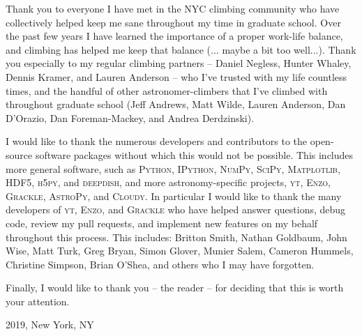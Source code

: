Thank you to everyone I have met in the NYC climbing community who have collectively
helped keep me sane throughout my time in graduate school. Over the past few years
I have learned the importance of a proper work-life balance, and climbing has helped
me keep that balance (... maybe a bit too well...). Thank you especially to my
regular climbing partners -- Daniel Negless, Hunter Whaley, Dennis Kramer, and Lauren Anderson -- who I've trusted
with my life countless times, and the handful of other astronomer-climbers that I've
climbed with throughout graduate school (Jeff Andrews, Matt Wilde, Lauren Anderson, Dan D'Orazio,
Dan Foreman-Mackey, and Andrea Derdzinski).

I would like to thank the numerous developers and contributors to the
open-source software packages without which this \dissertation would not be
possible. This includes more general software, such as \textsc{Python}, \textsc{IPython}, \textsc{NumPy},
\textsc{SciPy}, \textsc{Matplotlib}, \textsc{HDF5}, \textsc{h5py},
and \textsc{deepdish}, and more astronomy-specific projects,  \textsc{yt}, \textsc{Enzo},
\textsc{Grackle}, \textsc{AstroPy}, and \textsc{Cloudy}. In particular I would like
to thank the many developers of \textsc{yt}, \textsc{Enzo}, and \textsc{Grackle}
who have helped answer questions, debug code, review my pull requests, and implement
new features on my behalf throughout this process. This includes: Britton Smith, Nathan Goldbaum,
John Wise, Matt Turk, Greg Bryan, Simon Glover, Munier Salem, Cameron Hummels,
Christine Simpson, Brian O'Shea, and others who I may have forgotten.

Finally, I would like to thank you -- the reader -- for deciding that this
\dissertation is worth your attention.

\vspace{1.8cm}
2019, New York, NY

